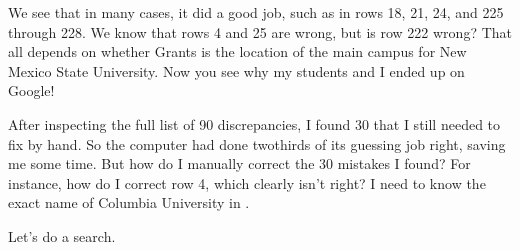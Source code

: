 \documentclass[letterpaper,10pt,english]{jupyterBook}
\begin{document}
\sphinxAtStartPar
We see that in many cases, it did a good job, such as in rows 18, 21, 24, and 225 through 228.  We know that rows 4 and 25 are wrong, but is row 222 wrong?  That all depends on whether Grants is the location of the main campus for New Mexico State University.  Now you see why my students and I ended up on Google!

\sphinxAtStartPar
After inspecting the full list of 90 discrepancies, I found 30 that I still needed to fix by hand.  So the computer had done two\sphinxhyphen{}thirds of its guessing job right, saving me some time.  But how do I manually correct the 30 mistakes I found?  For instance, how do I correct row 4, which clearly isn’t right?  I need to know the exact name of Columbia University in .

\sphinxAtStartPar
Let’s do a search.

\begin{sphinxVerbatim}[commandchars=\\\{\}]
\PYG{p}{[}\PYG{p}{[}\PYG{p}{]}  \PYG{p}{]}\PYG{p}{[}\PYG{p}{]}
\end{sphinxVerbatim}
\end{document}
